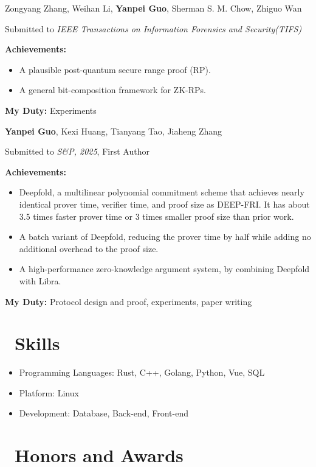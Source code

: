 \documentclass{resume}
\begin{document}
Zongyang Zhang, Weihan Li, \textbf{Yanpei Guo}, Sherman S. M. Chow, Zhiguo Wan

Submitted to \textit{IEEE Transactions on Information Forensics and Security(TIFS)}

\textbf{Achievements:}
\begin{itemize}
  \item A plausible post-quantum secure range proof (RP).
  \item A general bit-composition framework for ZK-RPs.
\end{itemize}
\textbf{My Duty:} Experiments

\textbf{Yanpei Guo}, Kexi Huang, Tianyang Tao, Jiaheng Zhang

Submitted to \textit{S\&P, 2025}, First Author

\textbf{Achievements:}
\begin{itemize}
  \item Deepfold, a multilinear polynomial commitment scheme that achieves nearly identical prover time, verifier time, and proof size as DEEP-FRI.
  It has about 3.5 times faster prover time or 3 times smaller proof size than prior work.
  \item A batch variant of Deepfold, reducing the prover time by half while adding no additional overhead to the proof size.
  \item A high-performance zero-knowledge argument system, by combining Deepfold with Libra.
\end{itemize}
\textbf{My Duty:} Protocol design and proof, experiments, paper writing

\section{\faCogs\ Skills}
\begin{itemize}[parsep=0.5ex]
  \item Programming Languages: Rust, C++, Golang, Python, Vue, SQL
  \item Platform: Linux
  \item Development: Database, Back-end, Front-end
\end{itemize}

\section{\faTrophy\ Honors and Awards}
\end{document}
